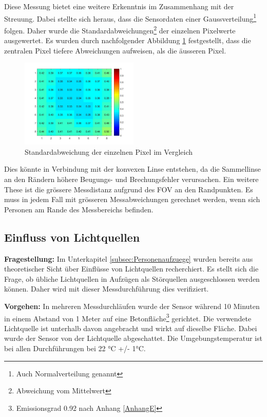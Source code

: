 Diese Messung bietet eine weitere Erkenntnis im Zusammenhang mit der Streuung. Dabei stellte sich heraus, dass die Sensordaten einer Gaussverteilung\footnote[16]{Auch Normalverteilung genannt} folgen. Daher wurde die Standardabweichungen\footnote[17]{Abweichung vom Mittelwert} der einzelnen Pixelwerte ausgewertet. Es wurden durch nachfolgender Abbildung \ref{fig:Streuung} festgestellt, dass die zentralen Pixel tiefere Abweichungen aufweisen, als die äusseren Pixel.

\begin{figure}[H]
	\centering
	\includegraphics[width=0.5\textwidth]
	{fig/Distanz_140cm_std_.jpg}
	\caption[Standardabweichung der einzelnen Pixel im Vergleich]{Standardabweichung der einzelnen Pixel im Vergleich}
	\label{fig:Streuung}
\end{figure}

Dies könnte in Verbindung mit der konvexen Linse entstehen, da die Sammellinse an den Rändern höhere Beugungs- und Brechungsfehler verursachen. Ein weitere These ist die grössere Messdistanz aufgrund des \ac{FOV} an den Randpunkten. Es muss in jedem Fall mit grösseren Messabweichungen gerechnet werden, wenn sich Personen am Rande des Messbereichs befinden.

\subsection{Einfluss von Lichtquellen}
\textbf{Fragestellung:} Im Unterkapitel \ref{subsec:Personenaufzuege} wurden bereits aus theoretischer Sicht über Einflüsse von Lichtquellen recherchiert. Es stellt sich die Frage, ob übliche Lichtquellen in Aufzügen als Störquellen ausgeschlossen werden können. Daher wird mit dieser Messdurchführung dies verifiziert.

\textbf{Vorgehen:} In mehreren Messdurchläufen wurde der Sensor während 10 Minuten in einem Abstand von 1 Meter auf eine Betonfläche\footnote[18]{Emissionsgrad 0.92 nach Anhang \ref{AnhangE}} gerichtet. Die verwendete Lichtquelle ist unterhalb davon angebracht und wirkt auf dieselbe Fläche. Dabei wurde der Sensor von der Lichtquelle abgeschattet. Die Umgebungstemperatur ist bei allen Durchführungen bei 22 °C +/- 1°C.

